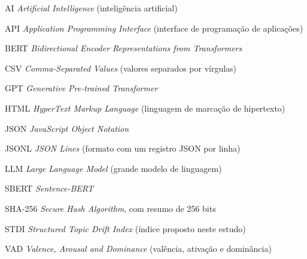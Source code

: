 \begin{siglas}
\item[AI] \textit{Artificial Intelligence} (inteligência artificial)
\item[API] \textit{Application Programming Interface} (interface de programação de aplicações)
\item[BERT] \textit{Bidirectional Encoder Representations from Transformers}
\item[CSV] \textit{Comma-Separated Values} (valores separados por vírgulas)
\item[GPT] \textit{Generative Pre-trained Transformer}
\item[HTML] \textit{HyperText Markup Language} (linguagem de marcação de hipertexto)
\item[JSON] \textit{JavaScript Object Notation}
\item[JSONL] \textit{JSON Lines} (formato com um registro JSON por linha)
\item[LLM] \textit{Large Language Model} (grande modelo de linguagem)
\item[SBERT] \textit{Sentence-BERT}
\item[SHA-256] \textit{Secure Hash Algorithm}, com resumo de 256 bits
\item[STDI] \textit{Structured Topic Drift Index} (índice proposto neste estudo)
\item[VAD] \textit{Valence, Arousal and Dominance} (valência, ativação e dominância)
\end{siglas}
